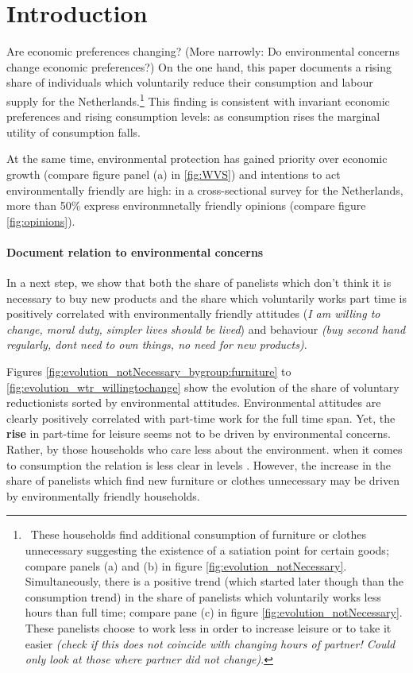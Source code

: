 \documentclass[12pt]{article}
\begin{document}
\section{Introduction}
Are economic preferences changing?  (More narrowly: Do environmental concerns change economic preferences?)
On the one hand, this paper documents a rising share of individuals which voluntarily reduce their consumption and labour supply for the Netherlands.\footnote{\ These households find additional consumption of furniture or clothes unnecessary suggesting the existence of a satiation point for certain goods; compare panels (a) and (b) in figure \ref{fig:evolution_notNecessary}. Simultaneously, there is a positive trend (which started later though than the consumption trend) in the share of panelists which voluntarily works less hours than full time; compare pane (c) in figure \ref{fig:evolution_notNecessary}. These panelists choose to work less in order to increase leisure or to take it easier \textit{(check if this does not coincide with changing hours of partner! Could only look at those where partner did not change)}.} 
This finding is consistent with invariant economic preferences and rising consumption levels: as consumption rises the marginal utility of consumption falls. 

At the same time, environmental protection has gained priority over economic growth (compare figure panel (a) in \ref{fig:WVS}) and intentions to act environmentally friendly are high:
in a cross-sectional survey for the Netherlands, more than 50\% express environmnetally friendly opinions (compare figure \ref{fig:opinions}).





\paragraph{Document relation to environmental concerns} 
In a next step, we show that both the share of panelists which don't think it is necessary to buy new products and the share which voluntarily works part time is positively correlated with environmentally friendly attitudes (\textit{I am willing to change, moral duty, simpler lives should be lived}) and behaviour \textit{(buy second hand regularly, dont need to own things, no need for new products)}.

Figures \ref{fig:evolution_notNecessary_bygroup:furniture} to \ref{fig:evolution_wtr_willingtochange} show the evolution of the share of voluntary reductionists sorted by environmental attitudes. 
Environmental attitudes are clearly positively correlated with part-time work for the full time span. Yet, the \textbf{rise} in part-time for leisure seems not to be driven by environmental concerns. Rather, by those households who care less about the environment. 
when it comes to consumption the relation is less clear in levels . However, the increase in the share of panelists which find new furniture or clothes unnecessary may be driven by environmentally friendly households. 
\end{document}
